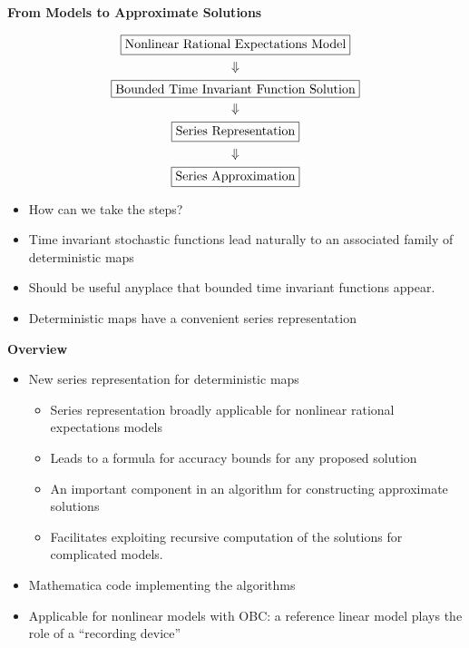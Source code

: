 \documentclass[12pt]{article}
\begin{document}
{\bf From Models to Approximate Solutions }

  \begin{gather}
    \fbox{Nonlinear Rational Expectations Model}\\ \Downarrow\\
\fbox{Bounded Time Invariant Function Solution}\\\Downarrow\\
\fbox{Series Representation}\\\Downarrow\\
\fbox{Series Approximation}
  \end{gather}
  \begin{itemize}
  \item  How can we take the  steps?
  \item Time invariant stochastic functions 
lead naturally to an associated family of deterministic maps

\item Should be useful anyplace that bounded time invariant functions appear.

\item Deterministic maps have a convenient series representation
  \end{itemize}


 {\bf Overview}

  \begin{itemize}
\item New series representation for deterministic maps
  \begin{itemize}
\item Series representation broadly applicable for nonlinear rational expectations models 
\item Leads to a formula for accuracy bounds for any proposed solution
\item An important component in an algorithm for constructing approximate solutions 
\item Facilitates exploiting recursive computation of the solutions for complicated models.
  \end{itemize}
\item Mathematica code implementing the algorithms
\item Applicable for nonlinear models with OBC: a reference linear model plays the role of a ``recording device''
  \end{itemize}
\end{document}
